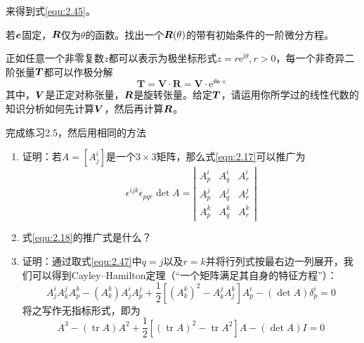 \begin{exercise}
\begin{enumerate}
\begin{equation*}
        \end{equation*}
        来得到式\eqref{equ:2.45}。
    \end{enumerate}
    \item 若$\boldsymbol{e}$固定，$\boldsymbol{R}$仅为$\theta $的函数。找出一个$\boldsymbol{R}(\theta )$的带有初始条件的一阶微分方程。
    \item 正如任意一个非零复数$z$都可以表示为极坐标形式$z=r\mathrm{e}^{\mathrm{i}\theta},r>0$，每一个非奇异二阶张量$\boldsymbol{T}$都可以作极分解
    \begin{equation*}
        \boldsymbol{T}=\boldsymbol{V}\cdot \boldsymbol{R}=\boldsymbol{V}\cdot \mathrm{e}^{\theta \boldsymbol{e}\times}
    \end{equation*}
    其中，$\boldsymbol{V}$是正定对称张量，$\boldsymbol{R}$是旋转张量。给定$\boldsymbol{T}$，请运用你所学过的线性代数的知识分析如何先计算$\boldsymbol{V}$，然后再计算$\boldsymbol{R}$。
    \item 完成练习2.5，然后用相同的方法
    \begin{enumerate}
        \item 证明：若$A=\left[ A_{j}^{i} \right] $是一个$3\times 3$矩阵，那么式\eqref{equ:2.17}可以推广为
        \begin{equation}\label{equ:2.47}
            \epsilon^{i j k} \epsilon_{p q r} \operatorname{det} A=\left|\begin{array}{ccc}
                A_p^i & A_q^i & A_r^i \\
                A_p^j & A_q^j & A_r^j \\
                A_p^k & A_q^k & A_r^k
                \end{array}\right|
        \end{equation}
        \item 式\eqref{equ:2.18}的推广式是什么？
        \item 证明：通过取式\eqref{equ:2.47}中$q=j$以及$r=k$并将行列式按最右边一列展开，我们可以得到Cayley–Hamilton定理（“一个矩阵满足其自身的特征方程”）：
        \begin{equation}
            A_j^i A_k^j A_p^k-\left(A_k^k\right) A_j^i A_p^j+\frac{1}{2}\left[\left(A_k^k\right)^2-A_k^j A_j^k\right] A_p^i-(\operatorname{det} A) \delta_p^i=0
        \end{equation}
        将之写作无指标形式，即为
        \begin{equation}
            A^3-(\operatorname{tr} A) A^2+\frac{1}{2}\left[(\operatorname{tr} A)^2-\operatorname{tr} A^2\right] A-(\operatorname{det} A) I=0
        \end{equation}

    \end{enumerate}
\end{exercise}
